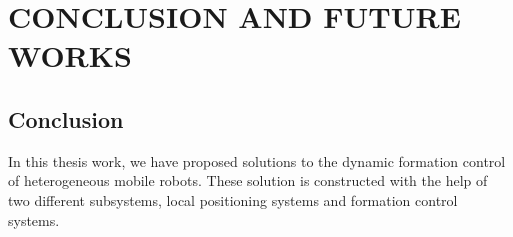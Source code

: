 

\chapter{CONCLUSION AND FUTURE WORKS}
\label{chp:conclusion}








	
\section{Conclusion}
In this thesis work, we have proposed solutions to the dynamic formation control of heterogeneous mobile robots. These solution is constructed with the help of two different subsystems, local positioning systems and formation control systems. 

